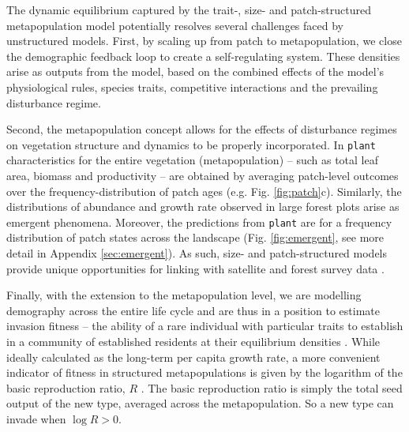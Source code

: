 \documentclass[a4paper,11pt]{article}
\newcommand{\plant}{\texttt{plant}}
\begin{document}
The dynamic equilibrium captured by the trait-, size- and
patch-structured metapopulation model potentially resolves several
challenges faced by unstructured models. First, by scaling up from
patch to metapopulation, we close the demographic feedback loop to
create a self-regulating system. These densities
arise as outputs from the model, based on the combined effects of the
model's physiological rules, species traits, competitive interactions
and the prevailing disturbance regime.

Second, the metapopulation concept allows for the effects of disturbance
regimes on vegetation structure and dynamics to be properly incorporated. In
{\plant} characteristics for the entire vegetation (metapopulation) -- such
as total leaf area, biomass and productivity -- are obtained by averaging
patch-level outcomes over the frequency-distribution of patch ages (e.g.
Fig. \ref{fig:patch}c).  Similarly, the distributions of  abundance and growth rate
observed in large forest  plots \citep[e.g.][]{Muller-2006, Coomes-2007} arise
as  emergent phenomena. Moreover, the predictions from {\plant}
are for a frequency distribution of patch states across the landscape
(Fig. \ref{fig:emergent}, see more detail in Appendix \ref{sec:emergent}). As such,
size- and patch-structured models provide unique opportunities for linking with
satellite and forest survey data \citep{Moorcroft-2001, Purves-2008}.

Finally, with the extension to the metapopulation level, we are
modelling demography across the entire life cycle and are thus in a
position to estimate invasion fitness -- the ability of a rare
individual with particular traits to establish in a community of
established residents at their equilibrium densities
\citep{Metz-1992, Chesson-2000}.  While ideally calculated as the
long-term per capita growth rate, a more convenient indicator of
fitness in structured metapopulations is given by the
logarithm of the basic reproduction ratio, \(R\)
\citep{Gyllenberg-2001, Metz-2001}.
The basic reproduction ratio is simply the total seed output of
the new type, averaged across the metapopulation. So a new type can
invade when \(\log R > 0\).
\end{document}
